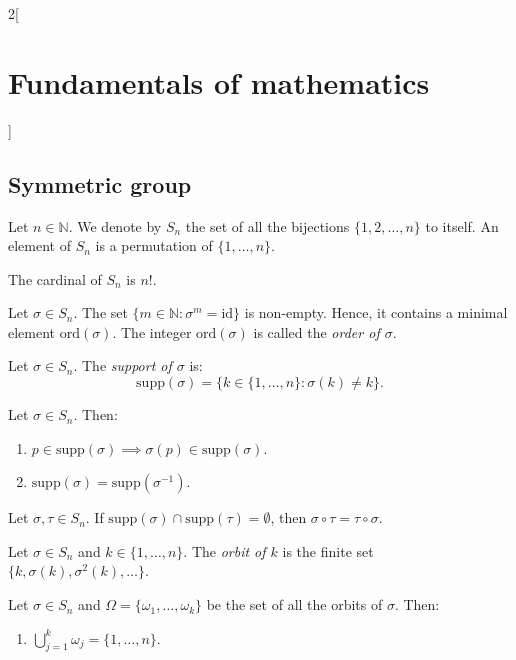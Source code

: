 \documentclass[../../../main.tex]{subfiles}
\begin{document}
\begin{multicols}{2}[\section{Fundamentals of mathematics}]
    \subsection{Symmetric group}
    \begin{definition}
        Let $n\in\mathbb{N}$. We denote by $S_n$ the set of all the bijections $\{1,2,\ldots,n\}$ to itself. An element of $S_n$ is a permutation of $\{1,\ldots,n\}$.
    \end{definition}
    \begin{theorem}
        The cardinal of $S_n$ is $n!$.
    \end{theorem}
    \begin{definition}
        Let $\sigma\in S_n$. The set $\{m\in\mathbb{N}:\sigma^m=\text{id}\}$ is non-empty. Hence, it contains a minimal element $\text{ord}(\sigma)$. The integer $\text{ord}(\sigma)$ is called the \textit{order of $\sigma$}.
    \end{definition}
    \begin{definition}
        Let $\sigma\in S_n$. The \textit{support of $\sigma$} is: $$\text{supp}(\sigma)=\{k\in\{1,\ldots,n\}: \sigma(k)\ne k\}.$$
    \end{definition}
    \begin{lemma}
        Let $\sigma\in S_n$. Then:
        \begin{enumerate}
            \item $p\in\text{supp}(\sigma)\implies \sigma(p)\in\text{supp}(\sigma)$.
            \item $\text{supp}(\sigma)=\text{supp}(\sigma^{-1})$.
        \end{enumerate}
    \end{lemma}
    \begin{lemma}
        Let $\sigma,\tau\in S_n$. If $\text{supp}(\sigma)\cap\text{supp}(\tau)=\emptyset$, then $\sigma\circ \tau=\tau\circ \sigma$.
    \end{lemma}
    \begin{definition}
        Let $\sigma\in S_n$ and $k\in\{1,\ldots,n\}$. The \textit{orbit of $k$} is the finite set $\{k,\sigma(k),\sigma^2(k),\ldots\}$.
    \end{definition}
    \begin{theorem}
        Let $\sigma\in S_n$ and $\Omega=\{\omega_1,\ldots,\omega_k\}$ be the set of all the orbits of $\sigma$. Then:
        \begin{enumerate}
            \item $\bigcup_{j=1}^k \omega_j=\{1,\ldots,n\}$.

\end{enumerate}
\end{theorem}
\end{multicols}
\end{document}
